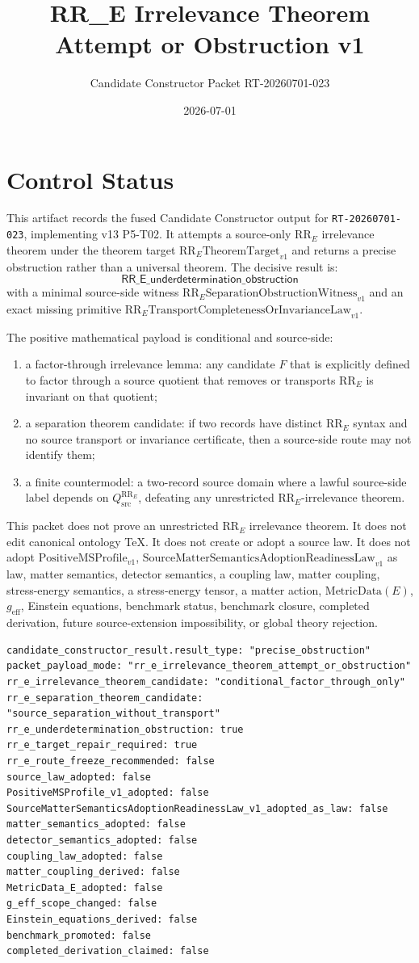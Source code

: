 \documentclass[11pt]{article}
\title{RR\_E Irrelevance Theorem Attempt or Obstruction v1}
\author{Candidate Constructor Packet RT-20260701-023}
\date{2026-07-01}
\newcommand{\RRE}{\mathrm{RR}_E}
\newcommand{\RRTarget}{\mathrm{RR}_{E}\mathrm{TheoremTarget}_{v1}}
\newcommand{\Qsrc}{Q^{\RRE}_{\mathrm{src}}}
\newcommand{\SMSAR}{\mathrm{SourceMatterSemanticsAdoptionReadinessLaw}_{v1}}
\newcommand{\PMSProf}{\mathrm{PositiveMSProfile}_{v1}}
\newcommand{\MetricData}{\mathrm{MetricData}}
\newcommand{\geff}{g_{\mathrm{eff}}}
\newcommand{\RRUnder}{\mathsf{RR\_E\_underdetermination\_obstruction}}
\newcommand{\RRWitness}{\mathrm{RR}_{E}\mathrm{SeparationObstructionWitness}_{v1}}
\newcommand{\RRMissing}{\mathrm{RR}_{E}\mathrm{TransportCompletenessOrInvarianceLaw}_{v1}}
\begin{document}
\maketitle

\section{Control Status}

This artifact records the fused Candidate Constructor output for
\texttt{RT-20260701-023}, implementing v13 P5-T02. It attempts a source-only
\(\RRE\) irrelevance theorem under the theorem target \(\RRTarget\) and returns
a precise obstruction rather than a universal theorem. The decisive result is:
\[
  \RRUnder
\]
with a minimal source-side witness \(\RRWitness\) and an exact missing
primitive \(\RRMissing\).

The positive mathematical payload is conditional and source-side:
\begin{enumerate}[leftmargin=*]
  \item a factor-through irrelevance lemma: any candidate \(F\) that is
  explicitly defined to factor through a source quotient that removes or
  transports \(\RRE\) is invariant on that quotient;
  \item a separation theorem candidate: if two records have distinct
  \(\RRE\) syntax and no source transport or invariance certificate, then a
  source-side route may not identify them;
  \item a finite countermodel: a two-record source domain where a lawful
  source-side label depends on \(\Qsrc\), defeating any unrestricted
  \(\RRE\)-irrelevance theorem.
\end{enumerate}

This packet does not prove an unrestricted \(\RRE\) irrelevance theorem. It
does not edit canonical ontology TeX. It does not create or adopt a source
law. It does not adopt \(\PMSProf\), \(\SMSAR\) as law, matter semantics,
detector semantics, a coupling law, matter coupling, stress-energy semantics,
a stress-energy tensor, a matter action, \(\MetricData(E)\), \(\geff\),
Einstein equations, benchmark status, benchmark closure, completed derivation,
future source-extension impossibility, or global theory rejection.

\begin{verbatim}
candidate_constructor_result.result_type: "precise_obstruction"
packet_payload_mode: "rr_e_irrelevance_theorem_attempt_or_obstruction"
rr_e_irrelevance_theorem_candidate: "conditional_factor_through_only"
rr_e_separation_theorem_candidate: "source_separation_without_transport"
rr_e_underdetermination_obstruction: true
rr_e_target_repair_required: true
rr_e_route_freeze_recommended: false
source_law_adopted: false
PositiveMSProfile_v1_adopted: false
SourceMatterSemanticsAdoptionReadinessLaw_v1_adopted_as_law: false
matter_semantics_adopted: false
detector_semantics_adopted: false
coupling_law_adopted: false
matter_coupling_derived: false
MetricData_E_adopted: false
g_eff_scope_changed: false
Einstein_equations_derived: false
benchmark_promoted: false
completed_derivation_claimed: false
\end{verbatim}
\end{document}
